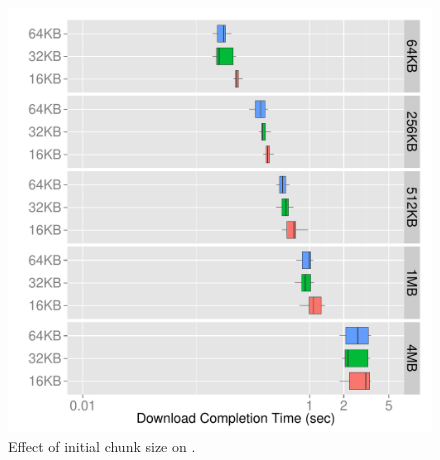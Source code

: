 \begin{figure}[!htb]
    \begin{minipage}[t]{0.8\linewidth}
    \begin{center}
        \includegraphics[width=\linewidth]{Figures/dynamic-slice-initial-chunk.pdf}
      	\caption{\label{fig:evaluation-initial-chunk-slice} Effect of initial chunk size on \algslice.}
    \end{center}
    \end{minipage}
  \vspace*{-0.3cm}
\end{figure}






